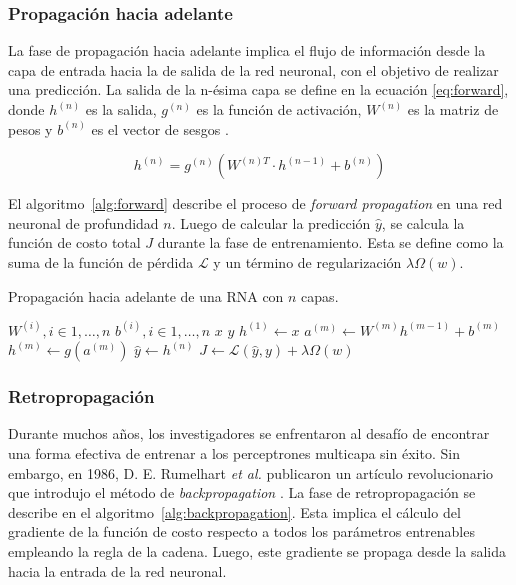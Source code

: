 \subsubsection{Propagación hacia adelante}
La fase de propagación hacia adelante implica el flujo de información desde la capa de entrada hacia la de 
salida de la red neuronal, con el objetivo de realizar una predicción. La salida de la n-ésima capa se 
define en la ecuación \ref{eq:forward}, donde $h^{(n)}$ es la salida, $g^{(n)}$ es la función de activación, $W^{(n)}$ 
es la matriz de pesos y $b^{(n)}$ es el vector de sesgos \citep{CITE:35} \citep{CITE:44}.

\begin{equation}
	\label{eq:forward}
	h^{(n)} = g^{(n)} (W^{(n)T} \cdot h^{(n-1)} + b^{(n)})
\end{equation}

El algoritmo~\ref{alg:forward} describe el proceso de \emph{forward propagation} en una red neuronal de profundidad $n$. 
Luego de calcular la predicción $\hat{y}$, se calcula la función de costo total $J$ durante la fase de entrenamiento. 
Esta se define como la suma de la función de pérdida $\mathcal{L}$ y un término de regularización $\lambda \Omega(w)$.

\begin{algorithm}
	\caption{Propagación hacia adelante de una RNA con $n$ capas.}
	\label{alg:forward}
	\begin{algorithmic}
		\Require $W^{(i)}, i \in 1, \ldots, n$ 
		\Require $b^{(i)}, i \in 1, \ldots, n$ 
		\Require $x$ 
		\Require $y$ 
		\State $h^{(1)} \gets x$
		\State $a^{(m)} \gets W^{(m)}h^{(m-1)} + b^{(m)} $
		\State $h^{(m)} \gets g(a^{(m)})$
		\EndFor
		\State $\hat{y} \gets h^{(n)}$
		\State $J \gets \mathcal{L}(\hat{y}, y) + \lambda \Omega(w)$ 
	\end{algorithmic}
\end{algorithm}

\subsubsection{Retropropagación}

Durante muchos años, los investigadores se enfrentaron al desafío de encontrar una forma 
efectiva de entrenar a los perceptrones multicapa sin éxito. Sin embargo, en 1986, D. E. 
Rumelhart \emph{et al.} publicaron un artículo revolucionario que introdujo el método 
de \emph{backpropagation} \citep{CITE:47}. La fase de retropropagación se describe en el 
algoritmo~\ref{alg:backpropagation}. Esta implica el cálculo del gradiente de la función de 
costo respecto a todos los parámetros entrenables empleando la regla de la cadena. 
Luego, este gradiente se propaga desde la salida hacia la entrada de la red neuronal.

